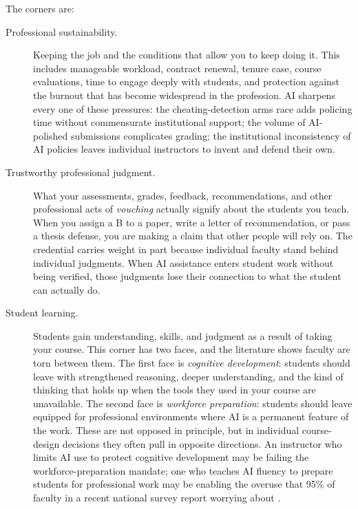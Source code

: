 \documentclass{SIAMbook2023}
\begin{document}
The corners are:

\begin{description}
\item[Professional sustainability.] Keeping the job and the conditions that allow you to keep doing it. This includes manageable workload, contract renewal, tenure case, course evaluations, time to engage deeply with students, and protection against the burnout that has become widespread in the profession. AI sharpens every one of these pressures: the cheating-detection arms race adds policing time without commensurate institutional support; the volume of AI-polished submissions complicates grading; the institutional inconsistency of AI policies leaves individual instructors to invent and defend their own.

\item[Trustworthy professional judgment.] What your assessments, grades, feedback, recommendations, and other professional acts of \emph{vouching} actually signify about the students you teach. When you assign a B to a paper, write a letter of recommendation, or pass a thesis defense, you are making a claim that other people will rely on. The credential carries weight in part because individual faculty stand behind individual judgments. When AI assistance enters student work without being verified, those judgments lose their connection to what the student can actually do.

\item[Student learning.] Students gain understanding, skills, and judgment as a result of taking your course. This corner has two faces, and the literature shows faculty are torn between them. The first face is \emph{cognitive development}: students should leave with strengthened reasoning, deeper understanding, and the kind of thinking that holds up when the tools they used in your course are unavailable. The second face is \emph{workforce preparation}: students should leave equipped for professional environments where AI is a permanent feature of the work. These are not opposed in principle, but in individual course-design decisions they often pull in opposite directions. An instructor who limits AI use to protect cognitive development may be failing the workforce-preparation mandate; one who teaches AI fluency to prepare students for professional work may be enabling the overuse that 95\% of faculty in a recent national survey report worrying about \citep{elon2026faculty}.
\end{description}
\end{document}
